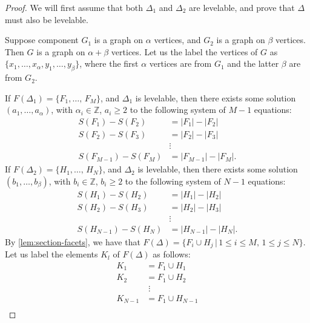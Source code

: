 \begin{proof}
We will first assume that both $\Delta_1$ and $\Delta_2$ are levelable, and prove that $\Delta$ must also be levelable.

Suppose component $G_1$ is a graph on $\alpha$ vertices, and $G_2$ is a graph on $\beta$ vertices. Then $G$ is a graph on $\alpha + \beta$ vertices. Let us the label the vertices of $G$ as $\{ x_1 , \dots , x_\alpha, y_{1} , \dots , y_{\beta} \}$, where the first $\alpha$ vertices are from $G_1$ and the latter $\beta$ are from $G_2$. 

If $F(\Delta_1) = \{ F_1, \dots , \, F_M \}$, and $\Delta_1$ is levelable, then there exists some solution $(a_1, \dots , a_\alpha)$, with $\alpha_i \in \mathbb{Z}$, $a_i \geq 2$ to the following system of $M-1$ equations:
\begin{equation}
\label{eq:G1system}
  \begin{aligned}
	S(F_1) - S(F_2) & = |F_1| - |F_2| \\
	S(F_2) - S(F_3) & = |F_2| - |F_3|\\
	&\vdots \\
	S(F_{M-1}) - S(F_M) & = |F_{M-1}| - |F_{M}|.
  \end{aligned}
\end{equation}
If $F(\Delta_2) = \{ H_{1}, \dots , \, H_N \}$, and $\Delta_2$ is levelable, then there exists some solution $(b_1, \dots , b_\beta)$, with $b_i \in \mathbb{Z}$, $b_i \geq 2$ to the following system of $N-1$ equations:
\begin{equation}
\label{eq:G2system}
  \begin{aligned}
	S(H_1) - S(H_2) & = |H_1| - |H_2| \\
	S(H_2) - S(H_3) & = |H_2| - |H_3|\\
	&\vdots \\
    S(H_{N-1}) - S(H_N)& = |H_{N-1}| - |H_N|.
  \end{aligned}
\end{equation}
By \autoref{lem:section-facets}, we have that $F(\Delta) = \{ F_i \cup H_j \, | \,  1 \leq i \leq M , \, 1 \leq j \leq N \}$. Let us label the elements $K_l$ of $F(\Delta)$ as follows:
\begin{equation} \label{all-facets}
\begin{aligned}
	K_1 &= F_1 \cup H_1 \\
    K_2 &= F_1 \cup H_2 \\
    & \; \vdots \\
    K_{N-1} &= F_1 \cup H_{N-1} \\

\end{aligned}
\end{equation}
\end{proof}
